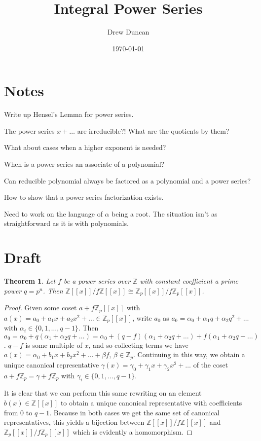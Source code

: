 \documentclass{article}
\title{Integral Power Series}
\author{Drew Duncan}
\date{\today}
\newtheorem{theorem}{Theorem}
\begin{document}
\maketitle

\section{Notes}
Write up Hensel's Lemma for power series.

The power series $x + \ldots$ are irreducible?!  What are the quotients by them?

What about cases when a higher exponent is needed?

When is a power series an associate of a polynomial?

Can reducible polynomial always be factored as a polynomial and a power series?

How to show that a power series factorization exists.

Need to work on the language of $\alpha$ being a root.  The situation isn't as straightforward as it is with polynomials.
\section{Draft}
\begin{theorem}
Let $f$ be a power series over $\mathbb{Z}$ with constant coefficient a prime power $q = p^n$.  Then $\mathbb{Z}[[x]]/f\mathbb{Z}[[x]] \cong \mathbb{Z}_p[[x]]/f\mathbb{Z}_p[[x]]$.
\end{theorem}
\begin{proof}
Given some coset $a + f\mathbb{Z}_p[[x]]$ with $a(x) = a_0 + a_1x + a_2x^2 + \ldots \in \mathbb{Z}_p[[x]]$, write $a_0$ as $a_0 = \alpha_0 + \alpha_1q + \alpha_2q^2 + \ldots$ with $\alpha_i \in \{0,1,\ldots,q-1\}$.  Then $a_0 = \alpha_0 + q(\alpha_1 + \alpha_2q + \ldots) = \alpha_0 + (q-f)(\alpha_1 + \alpha_2q + \ldots) + f(\alpha_1 + \alpha_2q + \ldots)$.  $q-f$ is some multiple of $x$, and so collecting terms we have $a(x) = \alpha_0 + b_1x + b_2x^2 + \ldots + \beta f$, $\beta \in \mathbb{Z}_p$.  Continuing in this way, we obtain a unique canonical representative $\gamma(x) = \gamma_0 + \gamma_1x + \gamma_2x^2 + \ldots$ of the coset $a + f\mathbb{Z}_p = \gamma + f\mathbb{Z}_p$ with $\gamma_i \in \{0,1,\ldots,q-1\}$.

It is clear that we can perform this same rewriting on an element $b(x) \in \mathbb{Z}[[x]]$ to obtain a unique canonical representative with coefficients from $0$ to $q-1$.  Because in both cases we get the same set of canonical representatives, this yields a bijection between $\mathbb{Z}[[x]]/f\mathbb{Z}[[x]]$ and $\mathbb{Z}_p[[x]]/f\mathbb{Z}_p[[x]]$ which is evidently a homomorphism.
\end{proof}
\end{document}
